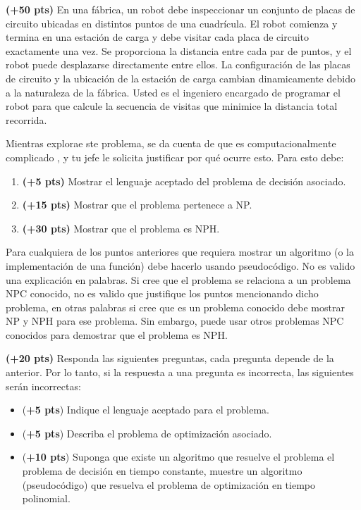 \documentclass[12pt, a4paper]{exam}
\begin{document}
\begin{questions}
    \pointsdroppedatright

    \question \textbf{(+50 pts)} 
    En una fábrica, un robot debe inspeccionar un conjunto de placas de circuito ubicadas 
    en distintos puntos de una cuadrícula. El robot comienza y termina en una estación de 
    carga y debe visitar cada placa de circuito exactamente una vez. Se proporciona la 
    distancia entre cada par de puntos, y el robot puede desplazarse directamente entre 
    ellos. La configuración de las placas de circuito y la ubicación de la estación de
    carga cambian dinamicamente  debido a la naturaleza de la fábrica. Usted es el 
    ingeniero encargado de programar el robot para que calcule la secuencia de visitas
    que minimice la distancia total recorrida.

    Mientras explorae ste problema, se da cuenta de que es computacionalmente complicado
    , y tu jefe le solicita justificar por qué ocurre esto. Para esto debe:

    \begin{enumerate}
        \item \textbf{(+5 pts)} Mostrar el lenguaje aceptado del problema de decisión asociado.
        \item \textbf{(+15 pts)} Mostrar que el problema pertenece a NP.  
        \item \textbf{(+30 pts)} Mostrar que el problema es NPH. 
    \end{enumerate}

    Para cualquiera de los puntos anteriores que requiera mostrar un algoritmo 
    (o la implementación de una función) debe hacerlo usando pseudocódigo. No es valido 
    una explicación en palabras. Si cree que el problema se relaciona a un problema NPC 
    conocido, no es valido que justifique los puntos mencionando dicho problema, en otras 
    palabras si cree que es un problema conocido debe mostrar NP y NPH para ese problema. 
    Sin embargo, puede usar otros problemas NPC conocidos para demostrar que el problema es NPH.

    \question \textbf{(+20 pts)} Responda las siguientes preguntas, cada pregunta depende 
    de la anterior. Por lo tanto, si la respuesta a una pregunta es incorrecta, las siguientes
    serán incorrectas: 
    \begin{itemize}
        \item (\textbf{+5 pts}) Indique el lenguaje aceptado para el problema.
        \item (\textbf{+5 pts}) Describa el problema de optimización asociado.
        \item (\textbf{+10 pts}) Suponga que existe un algoritmo que resuelve el problema
        el problema de decisión en tiempo constante, muestre un algoritmo (pseudocódigo)
        que resuelva el problema de optimización en tiempo polinomial.
    \end{itemize}


\end{questions}
\end{document}
